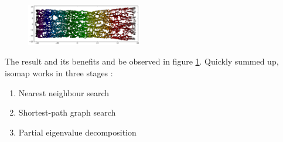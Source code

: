 \begin{figure}
	\centering
	\includegraphics[width=0.45\textwidth]{external_content/graphs/swiss_roll-manifold.png}
	\captionsetup{justification=centering}
	\label{fig:swissrollmanifold}
\end{figure}

\noindent
The result and its benefits and be observed in figure \ref{fig:swissrollmanifold}.
Quickly summed up, isomap works in three stages \cite{scikit-learn}:

\begin{enumerate}
	\vspace{-2mm}
	\item Nearest neighbour search
	\vspace{-2mm}
	\item Shortest-path graph search
	\vspace{-2mm}
	\item Partial eigenvalue decomposition
\end{enumerate}





